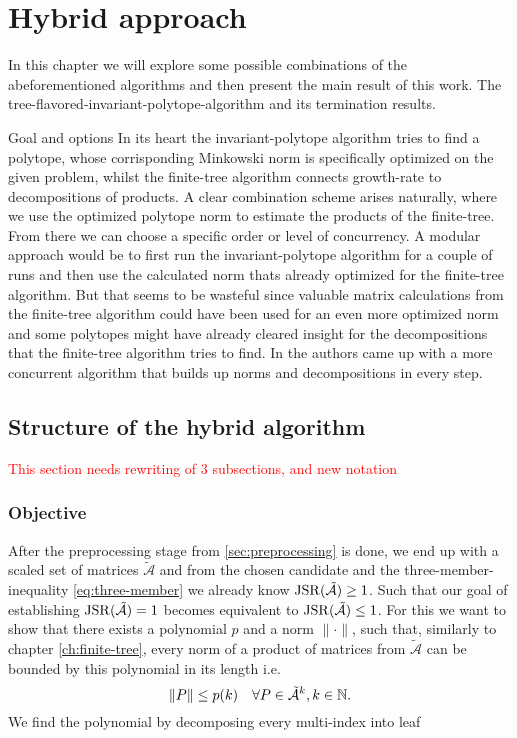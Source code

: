 
\chapter{Hybrid approach} 
\label{ch:hybrid}

In this chapter we will explore some possible combinations of the abeforementioned algorithms and then present the main result of this work. The tree-flavored-invariant-polytope-algorithm and its termination results. 

\begin{section}{Goal and options}
In its heart the invariant-polytope algorithm tries to find a polytope, whose corrisponding Minkowski norm is specifically optimized on the given problem, whilst the finite-tree algorithm connects growth-rate to decompositions of products. A clear combination scheme arises naturally, where we use the optimized polytope norm to estimate the products of the finite-tree. From there we can choose a specific order or level of concurrency.
\newline
A modular approach would be to first run the invariant-polytope algorithm for a couple of runs and then use the calculated norm thats already optimized for the finite-tree algorithm. But that seems to be wasteful since valuable matrix calculations from the finite-tree algorithm could have been used for an even more optimized norm and some polytopes might have already cleared insight for the decompositions that the finite-tree algorithm tries to find. In \citep{mejstrikHybridApproachJoint2024} the authors came up with a more concurrent algorithm that builds up norms and decompositions in every step. 
\end{section}

\section{Structure of the hybrid algorithm}
\textcolor{red}{This section needs rewriting of 3 subsections, and new notation}

\subsection{Objective}
After the preprocessing stage from \ref{sec:preprocessing} is done, we end up with a scaled set of matrices $\tilde{\mathcal{A}}$ and from the chosen candidate and the three-member-inequality \eqref{eq:three-member} we already know $\operatorname{JSR}(\tilde{\mathcal{A}}) \geq 1$. 
Such that our goal of establishing $\operatorname{JSR}(\tilde{\mathcal{A}}) = 1$ becomes equivalent to  $\operatorname{JSR}(\tilde{\mathcal{A}}) \leq 1$. 
For this we want to show that there exists a polynomial $p$ and a norm $\lVert \cdot \rVert$, such that, similarly to chapter \ref{ch:finite-tree}, every norm of a product of matrices from $\tilde{\mathcal{A}}$ can be bounded by this polynomial in its length i.e. $$ \lVert P \rVert \leq p(k) \quad \forall P \in \tilde{\mathcal{A}}^k, k \in \mathbb{N}. $$
We find the polynomial by decomposing every multi-index into leaf 

